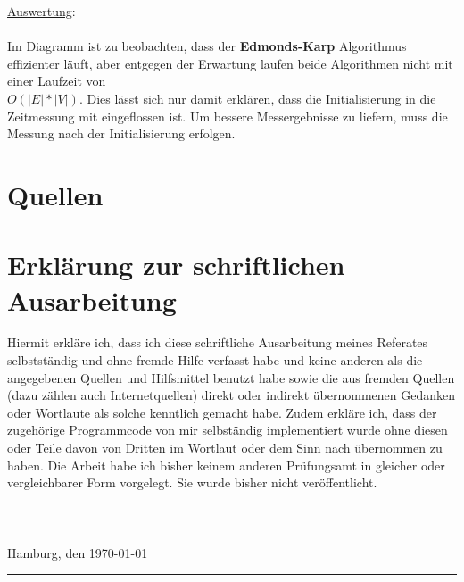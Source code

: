 \documentclass[11pt]{article}
\begin{document}
    \underline{Auswertung}:\\~\\
    Im Diagramm ist zu beobachten, dass der \textbf{Edmonds-Karp} Algorithmus effizienter l\"auft, aber entgegen der Erwartung laufen beide Algorithmen nicht mit einer Laufzeit von\\ $O(|E|*|V|)$. Dies l\"asst sich nur damit erkl\"aren, dass die Initialisierung in die Zeitmessung mit eingeflossen ist. Um bessere Messergebnisse zu liefern, muss die Messung nach der Initialisierung erfolgen.

    \newpage

    \section{Quellen}
    
    
    \newpage

    \section{Erkl\"arung zur schriftlichen Ausarbeitung}

    Hiermit erkl\"are ich, dass ich diese schriftliche Ausarbeitung meines Referates selbstst\"andig und ohne fremde Hilfe verfasst habe und keine anderen als die angegebenen Quellen und Hilfsmittel benutzt habe sowie die aus fremden Quellen (dazu z\"ahlen auch Internetquellen) direkt oder indirekt \"ubernommenen Gedanken oder Wortlaute als solche kenntlich gemacht habe. Zudem erkl\"are ich, dass der zugeh\"orige Programmcode von mir selbst\"andig implementiert wurde ohne diesen oder Teile davon von Dritten im Wortlaut oder dem Sinn nach \"ubernommen zu haben. Die Arbeit habe ich bisher keinem anderen Pr\"ufungsamt in gleicher oder vergleichbarer Form vorgelegt. Sie wurde bisher nicht ver\"offentlicht.\\ \\ \\ \\
    Hamburg, den \today \indent\rule{8.5cm}{0.4pt}
\end{document}
